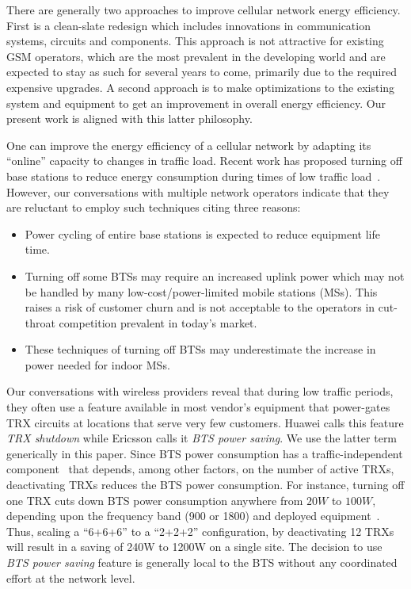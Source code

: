 There are generally two approaches to improve cellular network
energy efficiency. First is a clean-slate redesign which includes
innovations in communication systems, circuits and components.
This approach is not attractive for existing GSM operators,
which are the most prevalent in the developing world and are
expected to stay as such for several years to come, primarily due to the required expensive upgrades. 
A second approach is to make optimizations to the existing system
and equipment to get an improvement in overall energy
efficiency. Our present work is aligned with this latter
philosophy.

One can improve the energy efficiency of a cellular network by
adapting its ``online'' capacity to changes in traffic load.
Recent work has proposed turning off base stations to reduce
energy consumption during times of low traffic
load~\cite{Louhi:2007:BTSPower:INTELEC,Oh:Comm:2011,Peng:2011:BTSSaving:Mobicom,He:CellularPower:JN:2012}.
However, our conversations with multiple network operators
indicate that they are reluctant to employ such techniques
citing three reasons:
\begin{itemize}
\item Power cycling of entire base stations is expected to
    reduce equipment life time.
\item Turning off some BTSs may require an increased uplink
    power which may not be handled by many low-cost/power-limited mobile
    stations (MSs). This raises a risk of customer churn and is
    not acceptable to the operators in cut-throat
    competition prevalent in today's market.
\item These techniques of turning off BTSs may
    underestimate the increase in power needed for indoor
    MSs.
\end{itemize}

Our conversations with
wireless providers reveal that during low traffic periods, they often use a feature available in most vendor's equipment that power-gates TRX circuits at locations that
serve very few customers. Huawei calls this feature \textit{TRX shutdown} while Ericsson calls it \textit{BTS power saving}. We use the latter term generically in this paper. Since BTS power consumption has a traffic-independent
component~\cite{Peng:2011:BTSSaving:Mobicom} that depends,
among other factors, on the number of active TRXs, deactivating
TRXs reduces the BTS power consumption. For instance, turning
off one TRX cuts down BTS power consumption anywhere from $20W$
to $100W$, depending upon the frequency band (900 or 1800) and
deployed
equipment~\cite{Lorincz:BTS-Measure:Sensors:2012,flexibsc}.
Thus, scaling a ``6+6+6'' to a ``2+2+2'' configuration, by deactivating 12
TRXs will result in a saving of
240W to 1200W on a single site. The decision to use \textit{BTS
power saving} feature is generally local to the BTS without any
coordinated effort at the network level.

